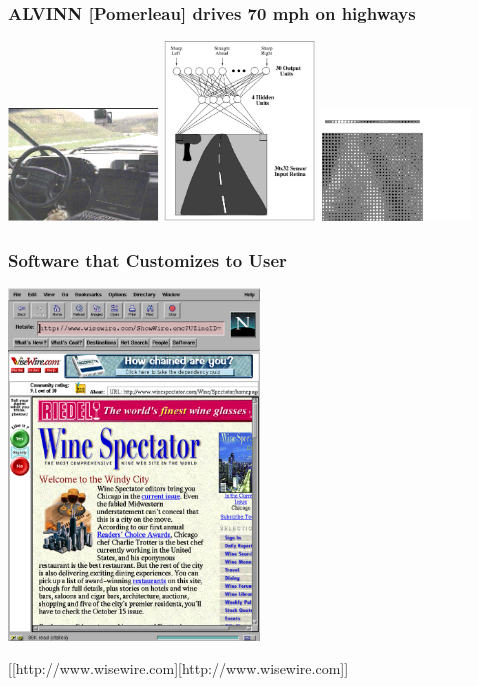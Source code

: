 \documentclass{beamer}
\begin{document}
\begin{frame}
\frametitle{ALVINN [Pomerleau] drives 70 mph on highways}
\label{sec-2-8}


\includegraphics[width=0.3\textwidth]{./image/nl5-interior-front-color.png}
\includegraphics[width=0.3\textwidth]{./image/alvinn1.png}
\includegraphics[width=0.3\textwidth]{./image/alvinn2.png}
\end{frame}
\begin{frame}
\frametitle{Software that Customizes to User}
\label{sec-2-9}

\center
\includegraphics[width=0.5\textwidth]{./image/wisewire.png}

\centerline{[[http://www.wisewire.com][http://www.wisewire.com]]}
\end{frame}
\end{document}
